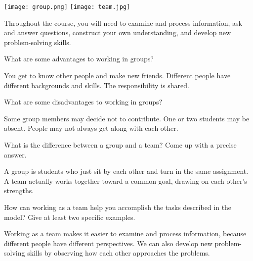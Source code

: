 

\begin{center}
\texttt{[image: group.png]}
\hspace{0.5in}
\texttt{[image: team.jpg]}
\end{center}

Throughout the course, you will need to examine and process information, ask and answer questions, construct your own understanding, and develop new problem-solving skills.



\Q What are some advantages to working in groups?

\begin{answer}[5em]
You get to know other people and make new friends.
Different people have different backgrounds and skills.
The responsibility is shared.
\end{answer}


\Q What are some disadvantages to working in groups?

\begin{answer}[5em]
Some group members may decide not to contribute.
One or two students may be absent.
People may not always get along with each other.
\end{answer}


\Q What is the difference between a group and a team? Come up with a precise answer.

\begin{answer}[5em]
A group is students who just sit by each other and turn in the same assignment.
A team actually works together toward a common goal, drawing on each other's strengths.
\end{answer}


\Q How can working as a team help you accomplish the tasks described in the model?
Give at least two specific examples.

\begin{answer}[5em]
Working as a team makes it easier to examine and process information, because different people have different perspectives.
We can also develop new problem-solving skills by observing how each other approaches the problems.
\end{answer}
